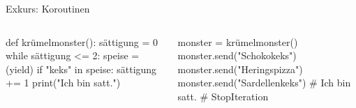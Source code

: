 \documentclass[xcolor=dvipsnames, aspectratio=169, 14pt]{beamer}
\begin{document}
\begin{frame}[fragile]{Exkurs: Koroutinen}
	\begin{columns}%
	\vspace{-\baselineskip}
	\begin{python3code}
	def krümelmonster():
		sättigung = 0
		while sättigung <= 2:
			speise = (yield)
			if "keks" in speise:
				sättigung += 1
		print("Ich bin satt.")
	\end{python3code}
	
	\vspace{-\baselineskip}
	\begin{python3code}
	monster = krümelmonster()
	monster.send("Schokokeks")
	monster.send("Heringspizza")
	monster.send("Sardellenkeks")
	# Ich bin satt.
	# StopIteration
	\end{python3code}
	\end{columns}
\end{frame}
\end{document}
